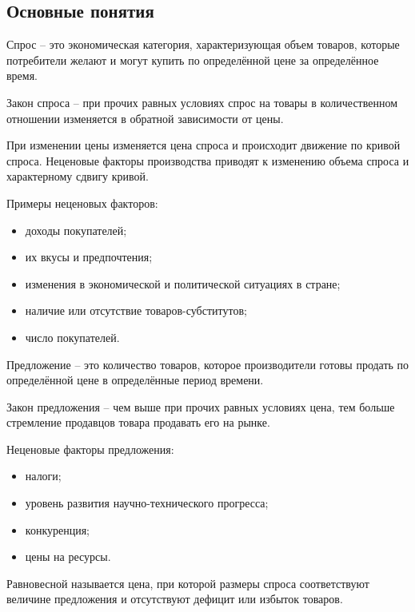 \subsection{Основные понятия}
Спрос -- это экономическая категория, характеризующая объем товаров, которые
потребители желают и могут купить по определённой цене за определённое время.

Закон спроса -- при прочих равных условиях спрос на товары в количественном
отношении изменяется в обратной зависимости от цены.


При изменении цены изменяется цена спроса и происходит движение по кривой
спроса. Неценовые факторы производства приводят к изменению объема спроса и
характерному сдвигу кривой.

Примеры неценовых факторов:
\begin{itemize}
    \item доходы покупателей;
    \item их вкусы и предпочтения;
    \item изменения в экономической и политической ситуациях в стране;
    \item наличие или отсутствие товаров-субститутов;
    \item число покупателей.
\end{itemize}

Предложение -- это количество товаров, которое производители готовы продать по
определённой цене в определённые период времени.

Закон предложения -- чем выше при прочих равных условиях цена, тем больше
стремление продавцов товара продавать его на рынке.


Неценовые факторы предложения:
\begin{itemize}
    \item налоги;
    \item уровень развития научно-технического прогресса;
    \item конкуренция;
    \item цены на ресурсы.
\end{itemize}

Равновесной называется цена, при которой размеры спроса соответствуют величине
предложения и отсутствуют дефицит или избыток товаров.


